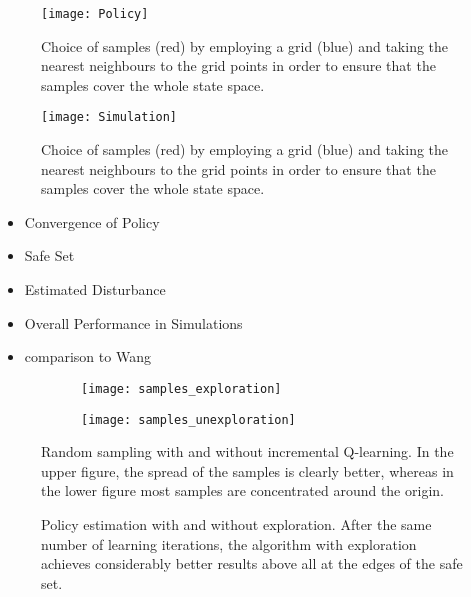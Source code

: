 \documentclass[../main.tex]{subfiles}
\begin{document}
\begin{figure}
    \centering
   \texttt{[image: Policy]}
        \caption{Choice of samples (red) by employing a grid (blue) and taking the nearest neighbours to the grid points in order to ensure that the samples cover the whole state space.}  \label{fig:Policy}
\end{figure}

\begin{figure}
    \centering
    \texttt{[image: Simulation]}
        \caption{Choice of samples (red) by employing a grid (blue) and taking the nearest neighbours to the grid points in order to ensure that the samples cover the whole state space.}  \label{fig:Simulation}
\end{figure}

\begin{itemize}
    \item Convergence of Policy
    \item Safe Set 
    \item Estimated Disturbance
    \item Overall Performance in Simulations
    \item comparison to Wang
\end{itemize}
\fi

\begin{figure}
    \centering
    \begin{subfigure}[b]{\textwidth}
    \texttt{[image: samples\_exploration]}
    \end{subfigure}
    
    \begin{subfigure}[b]{\textwidth}
    \texttt{[image: samples\_unexploration]}
    \end{subfigure}
        \caption{Random sampling with and without incremental Q-learning. In the upper figure, the spread of the samples is clearly better, whereas in the lower figure most samples are concentrated around the origin.}  \label{fig:samples_exploration}
\end{figure}


\begin{figure}
    \centering
    \caption{Policy estimation with and without exploration. After the same number of learning iterations, the algorithm with exploration achieves considerably better results above all at the edges of the safe set.} \label{fig:policy_exploration}
\end{figure}
\end{document}
